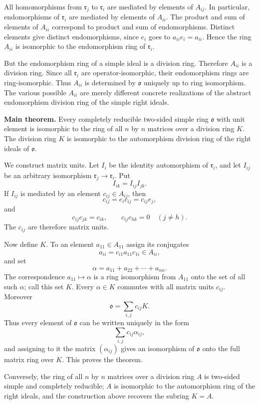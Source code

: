 \documentclass[
  11pt,
]{article}
\begin{document}
All homomorphisms from \(\mathfrak r_j\) to \(\mathfrak r_i\) are
mediated by elements of \(A_{ij}\). In particular, endomorphisms of
\(\mathfrak r_i\) are mediated by elements of \(A_{ii}\). The product
and sum of elements of \(A_{ii}\) correspond to product and sum of
endomorphisms. Distinct elements give distinct endomorphisms, since
\(e_i\) goes to \(a_{ii}e_i=a_{ii}\). Hence the ring \(A_{ii}\) is
isomorphic to the endomorphism ring of \(\mathfrak r_i\).

But the endomorphism ring of a simple ideal is a division ring.
Therefore \(A_{ii}\) is a division ring. Since all \(\mathfrak r_i\) are
operator-isomorphic, their endomorphism rings are ring-isomorphic. Thus
\(A_{ii}\) is determined by \(\mathfrak{o}\) uniquely up to ring
isomorphism. The various possible \(A_{ii}\) are merely different
concrete realizations of the abstract endomorphism division ring of the
simple right ideals.

\textbf{Main theorem.} Every completely reducible two-sided simple ring
\(\mathfrak{o}\) with unit element is isomorphic to the ring of all
\(n\) by \(n\) matrices over a division ring \(K\). The division ring
\(K\) is isomorphic to the automorphism division ring of the right
ideals of \(\mathfrak{o}\).

We construct matrix units. Let \(I_i\) be the identity automorphism of
\(\mathfrak r_i\), and let \(I_{ij}\) be an arbitrary isomorphism
\(\mathfrak r_j\to\mathfrak r_i\). Put \[
  I_{ik}=I_{ij}I_{jk}.
\] If \(I_{ij}\) is mediated by an element \(c_{ij}\in A_{ij}\), then \[
  c_{ij}=e_i c_{ij}=c_{ij}e_j,
\] and \[
  c_{ij}c_{jk}=c_{ik},
  \qquad
  c_{ij}c_{hk}=0\quad(j\ne h).
\] The \(c_{ij}\) are therefore matrix units.

Now define \(K\). To an element \(a_{11}\in A_{11}\) assign its
conjugates \[
  a_{ii}=c_{i1}a_{11}c_{1i}\in A_{ii},
\] and set \[
  \alpha=a_{11}+a_{22}+\cdots+a_{nn}.
\] The correspondence \(a_{11}\mapsto\alpha\) is a ring isomorphism from
\(A_{11}\) onto the set of all such \(\alpha\); call this set \(K\).
Every \(\alpha\in K\) commutes with all matrix units \(c_{ij}\).
Moreover \[
  \mathfrak{o}=\sum_{i,j} c_{ij}K.
\] Thus every element of \(\mathfrak{o}\) can be written uniquely in the
form \[
  \sum_{i,j} c_{ij}\alpha_{ij},
\] and assigning to it the matrix \((\alpha_{ij})\) gives an isomorphism
of \(\mathfrak{o}\) onto the full matrix ring over \(K\). This proves
the theorem.

Conversely, the ring of all \(n\) by \(n\) matrices over a division ring
\(A\) is two-sided simple and completely reducible; \(A\) is isomorphic
to the automorphism ring of the right ideals, and the construction above
recovers the subring \(K=A\).
\end{document}
